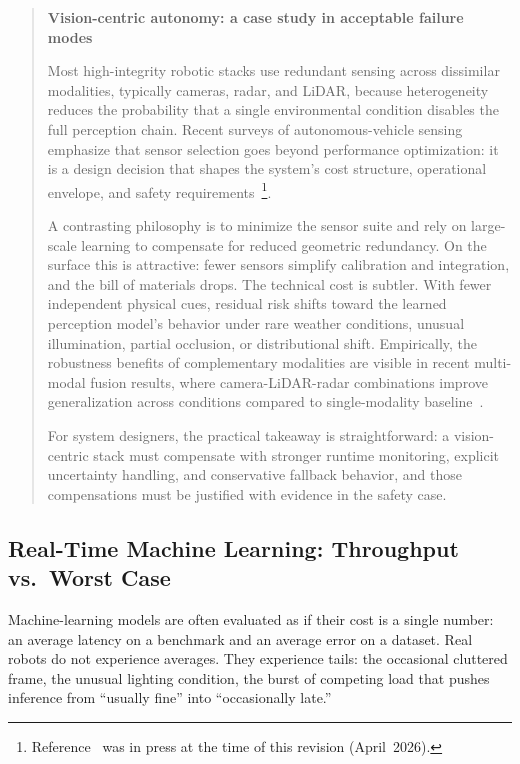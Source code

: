 \documentclass[smallextended]{svjour3}
\newenvironment{designbox}[1]{%
  \begin{quote}\small\noindent\textbf{#1}\par\smallskip%
}{\end{quote}}
\begin{document}
\begin{designbox}{Vision-centric autonomy: a case study in acceptable failure modes}
Most high-integrity robotic stacks use redundant sensing across dissimilar modalities, typically cameras, radar, and LiDAR, because heterogeneity reduces the probability that a single environmental condition disables the full perception chain. Recent surveys of autonomous-vehicle sensing emphasize that sensor selection goes beyond performance optimization: it is a design decision that shapes the
system's cost structure, operational envelope, and safety requirements~\cite{sensorlayoutreview2026,sensorsreview2026}\footnote{Reference~\cite{sensorlayoutreview2026} was in press at the time of this revision (April~2026).}.

A contrasting philosophy is to minimize the sensor suite and rely on large-scale learning to compensate for reduced geometric redundancy.  On the surface this is attractive: fewer sensors simplify calibration and integration, and the bill of materials drops.
The technical cost is subtler. With fewer independent physical cues, residual risk shifts toward the learned perception model's behavior under rare weather conditions, unusual illumination, partial occlusion, or distributional shift. Empirically, the robustness benefits of complementary modalities are visible in recent multi-modal fusion results, where camera-LiDAR-radar combinations improve generalization across conditions compared to single-modality baseline~\cite{ali2026fusion}.

For system designers, the practical takeaway is straightforward:  a vision-centric stack must compensate with stronger runtime monitoring, explicit uncertainty handling, and conservative fallback behavior, and those compensations must be justified with evidence in the safety case.
\end{designbox}

\subsection{Real-Time Machine Learning: Throughput vs.\ Worst Case}

Machine-learning models are often evaluated as if their cost is a single number: an average latency on a benchmark and an average error on a dataset. Real robots do not experience averages. They experience tails: the occasional cluttered frame, the unusual lighting condition, the burst of competing load that pushes inference from ``usually fine'' into ``occasionally late.''
\end{document}
